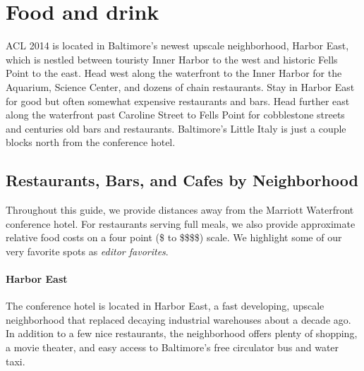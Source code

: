 \section{Food and drink}
\label{restaurant-guide}
\thispagestyle{emptyheader}

ACL 2014 is located in Baltimore's newest upscale neighborhood, Harbor
East, which is nestled between touristy Inner Harbor to the west and
historic Fells Point to the east. Head west along the waterfront to
the Inner Harbor for the Aquarium, Science Center, and dozens of chain
restaurants. Stay in Harbor East for good but often somewhat expensive
restaurants and bars. Head further east along the waterfront past
Caroline Street to Fells Point for cobblestone streets and centuries
old bars and restaurants. Baltimore's Little Italy is just a couple
blocks north from the conference hotel.

\newcommand{\gradstudent}{\$\xspace}
\newcommand{\postdoc}{\$\$\xspace}
\newcommand{\professor}{\$\$\$\xspace}
\newcommand{\industry}{\$\$\$\$\xspace}

\newenvironment{restaurant}[6]{
  \item[#6]{#1 (#2, #3 miles away) #4 #5.}
}{}

\subsection*{Restaurants, Bars, and Cafes by Neighborhood}

Throughout this guide, we provide distances away from the Marriott
Waterfront conference hotel. For restaurants serving full meals, we
also provide approximate relative food costs on a four point (\gradstudent to
\industry) scale. We highlight some of our very favorite spots as {\it
  editor favorites}.

\paragraph*{Harbor East}
The conference hotel is located in Harbor East, a fast developing, upscale neighborhood that replaced decaying industrial warehouses about a decade ago. In addition to a few nice restaurants, the neighborhood offers plenty of shopping, a movie theater, and easy access to Baltimore's free circulator bus and water taxi. 

